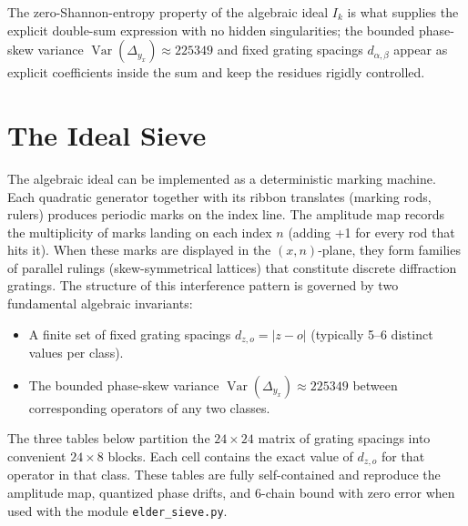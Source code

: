\documentclass[11pt,a4paper]{article}
\begin{document}
The zero-Shannon-entropy property of the algebraic ideal \(I_k\) is what supplies the explicit double-sum expression with no hidden singularities; the bounded phase-skew variance \(\operatorname{Var}(\Delta_{y_x})\approx225349\) and fixed grating spacings \(d_{\alpha,\beta}\) appear as explicit coefficients inside the sum and keep the residues rigidly controlled.


\section{The Ideal Sieve}
The algebraic ideal can be implemented as a deterministic marking machine. Each quadratic generator together with its ribbon translates (marking rods, rulers) produces periodic marks on the index line. The amplitude map records the multiplicity of marks landing on each index \(n\) (adding +1 for every rod that hits it). When these marks are displayed in the \((x,n)\)-plane, they form families of parallel rulings (skew-symmetrical lattices) that constitute discrete diffraction gratings. The structure of this interference pattern is governed by two fundamental algebraic invariants:

\begin{itemize}
\item A finite set of fixed grating spacings \(d_{z,o}=|z-o|\) (typically 5--6 distinct values per class).
\item The bounded phase-skew variance \(\operatorname{Var}(\Delta_{y_x})\approx225349\) between corresponding operators of any two classes. 
\end{itemize}


The three tables below partition the \(24 \times 24\) matrix of grating spacings into convenient \(24 \times 8\) blocks. Each cell contains the exact value of \(d_{z,o}\) for that operator in that class. These tables are fully self-contained and reproduce the amplitude map, quantized phase drifts, and 6-chain bound with zero error when used with the module \texttt{elder\_sieve.py}.
\end{document}
